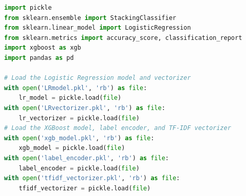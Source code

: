 \begin{tcolorbox}[colback=gray!5!white, colframe=gray!80!black, boxrule=0.5pt, title=Ensemble Model 1 : Loading and Preprocessing]
    \begin{lstlisting}[language=Python]
import pickle
from sklearn.ensemble import StackingClassifier
from sklearn.linear_model import LogisticRegression
from sklearn.metrics import accuracy_score, classification_report
import xgboost as xgb
import pandas as pd

# Load the Logistic Regression model and vectorizer
with open('LRmodel.pkl', 'rb') as file:
    lr_model = pickle.load(file)
with open('LRvectorizer.pkl', 'rb') as file:
    lr_vectorizer = pickle.load(file)
# Load the XGBoost model, label encoder, and TF-IDF vectorizer
with open('xgb_model.pkl', 'rb') as file:
    xgb_model = pickle.load(file)
with open('label_encoder.pkl', 'rb') as file:
    label_encoder = pickle.load(file)
with open('tfidf_vectorizer.pkl', 'rb') as file:
    tfidf_vectorizer = pickle.load(file)
    \end{lstlisting}
\end{tcolorbox}

